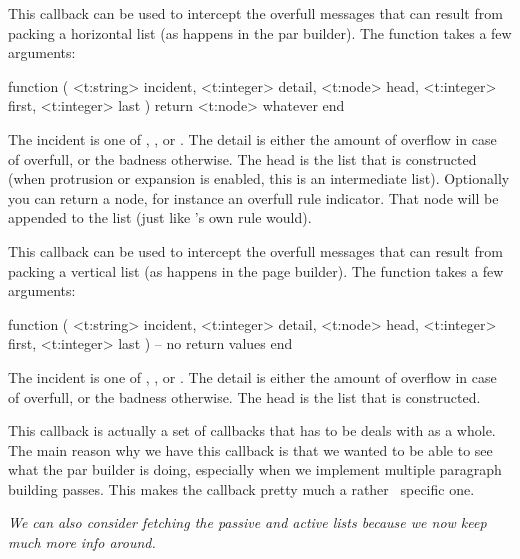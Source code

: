 \stopsubsection

\stopsection

\startsection[title=Tracing]

\startsubsection[title=hpack_quality]

This callback can be used to intercept the overfull messages that can result from
packing a horizontal list (as happens in the par builder). The function takes a
few arguments:

\starttyping[option=LUA]
function (
    <t:string>  incident,
    <t:integer> detail,
    <t:node>    head,
    <t:integer> first,
    <t:integer> last
 )
    return <t:node> whatever
end
\stoptyping

The incident is one of , ,  or
. The detail is either the amount of overflow in case of \type
{overfull}, or the badness otherwise. The head is the list that is constructed
(when protrusion or expansion is enabled, this is an intermediate list).
Optionally you can return a node, for instance an overfull rule indicator. That
node will be appended to the list (just like \TEX's own rule would).

\stopsubsection

\startsubsection[title=vpack_quality]

This callback can be used to intercept the overfull messages that can result from
packing a vertical list (as happens in the page builder). The function takes a
few arguments:

\starttyping[option=LUA]
function (
    <t:string>  incident,
    <t:integer> detail,
    <t:node>    head,
    <t:integer> first,
    <t:integer> last
)
    -- no return values
end
\stoptyping

The incident is one of , ,  or
. The detail is either the amount of overflow in case of \type
{overfull}, or the badness otherwise. The head is the list that is constructed.

\stopsubsection

\startsubsection[title=line_break]

This callback is actually a set of callbacks that has to be deals with as a
whole. The main reason why we have this callback is that we wanted to be able to
see what the par builder is doing, especially when we implement multiple
paragraph building passes. This makes the callback pretty much a rather \CONTEXT\
specific one.

{\em We can also consider fetching the passive and active lists because we now keep
much more info around.}

